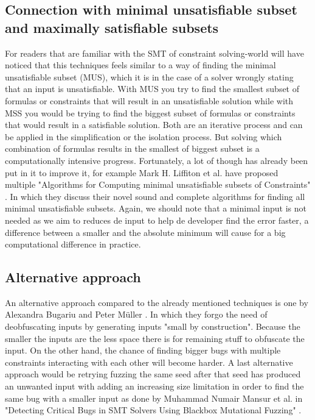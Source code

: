 \subsection{Connection with minimal unsatisfiable subset and maximally satisfiable subsets}
\label{inputReduction:MUS/MSS}
For readers that are familiar with the SMT of constraint solving-world will have noticed that this techniques feels similar to a way of finding the minimal unsatisfiable subset (MUS), which it is in the case of a solver wrongly stating that an input is unsatisfiable. 
With MUS you try to find the smallest subset of formulas or constraints that will result in an unsatisfiable solution while with 
MSS you would be trying to find the biggest subset of formulas or constraints that would result in a satisfiable solution. Both are an iterative process and can be applied in the simplification or the isolation process. But solving which combination of formulas results in the smallest of biggest subset is a computationally intensive progress. Fortunately, a lot of though has already been put in it to improve it, for example Mark H. Liffiton et al. have proposed multiple "Algorithms for Computing minimal unsatisfiable subsets of Constraints" \cite{51liffiton2008algorithms}. In which they discuss their novel sound and complete algorithms for finding all minimal unsatisfiable subsets. Again, we should note that a minimal input is not needed as we aim to reduces de input to help de developer find the error faster, a difference between a smaller and the absolute minimum will cause for a big computational difference in practice.

\subsection{Alternative approach}
\label{inputReduction:alt2deobfuscating}
An alternative approach compared to the already mentioned techniques is one by Alexandra Bugariu and Peter M\"uller \cite{9bugariu2020automaticallyTestingStringSolvers}. In which they forgo the need of deobfuscating inputs by generating inputs "small by construction". 
Because the smaller the inputs are the less space there is for remaining stuff to obfuscate the input. On the other hand, the chance of finding bigger bugs with multiple constraints interacting with each other will become harder.
A last alternative approach would be retrying fuzzing the same seed after that seed has produced an unwanted input with adding an increasing size limitation in order to find the same bug with a smaller input as done by Muhammad Numair Mansur et al. in "Detecting Critical Bugs in SMT Solvers Using Blackbox Mutational Fuzzing" \cite{1mansur2020detecting}.

